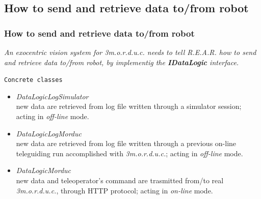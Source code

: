 \subsection{How to send and retrieve data to/from robot}
\frame
{
  \frametitle{How to send and retrieve data to/from robot}
  
  \emph{An exocentric vision system for \textit{3m.o.r.d.u.c.} 
    needs to tell \textit{R.E.A.R.} how to send and retrieve data to/from robot,
    by implementig the \textbf{IDataLogic} interface.}
  \pause

  \begin{block} {\alert{\texttt{Concrete classes}}}

    \begin{itemize}
      
    \pause
    \item \alert{\textit{DataLogicLogSimulator}} \\
      \footnotesize{
        new data are retrieved from log file written through
        a simulator session; acting
        in \textit{off-line} mode.
        }
    \pause
    \item \alert{\textit{DataLogicLogMorduc}} \\
      \footnotesize{
        new data are retrieved from log file written through
        a previous on-line teleguiding run accomplished with
        \textit{3m.o.r.d.u.c.}; acting
        in \textit{off-line} mode.
      }
    \pause
    \item \alert{\textit{DataLogicMorduc}} \\
      \footnotesize{
        new data and teleoperator's command are trasmitted from/to real 
        \textit{3m.o.r.d.u.c.}, through HTTP protocol; acting in
        \textit{on-line} mode.
      }
    \end{itemize}

  \end{block}
}


